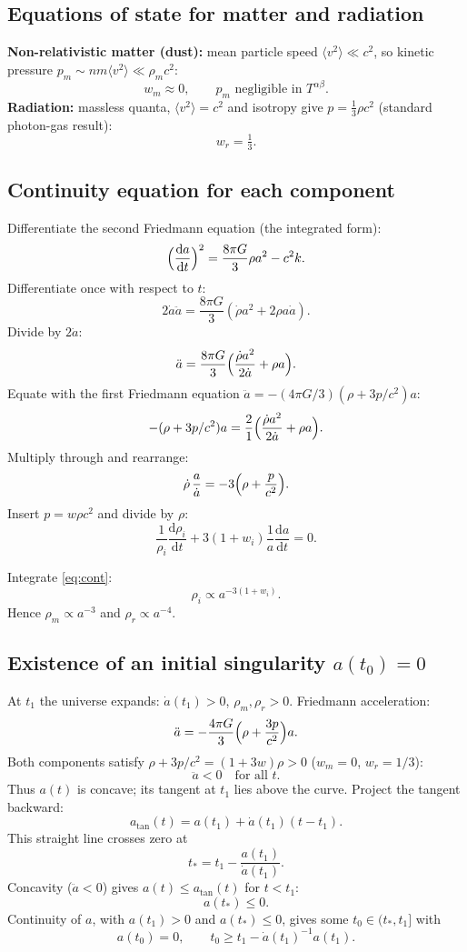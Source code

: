\documentclass[11pt]{article}
\newcommand{\de}{\mathrm{d}}
\begin{document}
\subsection*{Equations of state for matter and radiation}

\textbf{Non-relativistic matter (dust):} mean particle speed $\langle v^{2}\rangle\ll c^{2}$, so kinetic pressure $p_{m}\sim n m\langle v^{2}\rangle\ll \rho_{m} c^{2}$:
\[ w_{m}\approx 0,\qquad p_{m}\text{ negligible in }T^{\alpha\beta}. \]
\textbf{Radiation:} massless quanta, $\langle v^{2}\rangle=c^{2}$ and isotropy give $p=\tfrac13\rho c^{2}$ (standard photon-gas result):
\[ w_{r}=\tfrac13. \]

\subsection*{Continuity equation for each component}

Differentiate the second Friedmann equation (the integrated form):
\[ \Bigl(\frac{\de a}{\de t}\Bigr)^{2} = \frac{8\pi G}{3}\rho a^{2} - c^{2}k. \]
Differentiate once with respect to $t$:
\[ 2\dot a\ddot a = \frac{8\pi G}{3}(\dot\rho a^{2}+2\rho a\dot a). \]
Divide by $2\dot a$:
\[ \ddot a = \frac{8\pi G}{3}\Bigl(\frac{\dot\rho a^{2}}{2\dot a}+\rho a\Bigr). \]
Equate with the first Friedmann equation $\ddot a = -(4\pi G/3)(\rho+3p/c^{2})a$:
\[ -(\rho+3p/c^{2})a = \frac{2}{1}\Bigl(\frac{\dot\rho a^{2}}{2\dot a}+\rho a\Bigr). \]
Multiply through and rearrange:
\[ \dot\rho\,\frac{a}{\dot a} = -3\Bigl(\rho+\frac{p}{c^{2}}\Bigr). \]
Insert $p=w\rho c^{2}$ and divide by $\rho$:
\[ \boxed{\;\frac{1}{\rho_{i}}\frac{\de\rho_{i}}{\de t} + 3(1+w_{i})\frac{1}{a}\frac{\de a}{\de t} = 0.\;}\label{eq:cont} \]

Integrate \eqref{eq:cont}:
\[ \rho_{i} \propto a^{-3(1+w_{i})}. \]
Hence $\rho_{m}\propto a^{-3}$ and $\rho_{r}\propto a^{-4}$.

\subsection*{Existence of an initial singularity $a(t_{0})=0$}

At $t_{1}$ the universe expands: $\dot a(t_{1})>0$, $\rho_{m},\rho_{r}>0$. Friedmann acceleration:
\[ \ddot a = -\frac{4\pi G}{3}\Bigl(\rho+\frac{3p}{c^{2}}\Bigr)a. \]
Both components satisfy $\rho+3p/c^{2}=(1+3w)\rho>0$ ($w_{m}=0$, $w_{r}=1/3$):
\[ \ddot a < 0\quad\text{for all }t. \]
Thus $a(t)$ is concave; its tangent at $t_{1}$ lies above the curve. Project the tangent backward:
\[ a_{\text{tan}}(t) = a(t_{1}) + \dot a(t_{1})(t-t_{1}). \]
This straight line crosses zero at
\[ t_{*} = t_{1} - \frac{a(t_{1})}{\dot a(t_{1})}. \]
Concavity ($\ddot a<0$) gives $a(t)\le a_{\text{tan}}(t)$ for $t<t_{1}$:
\[ a(t_{*})\le 0. \]
Continuity of $a$, with $a(t_{1})>0$ and $a(t_{*})\le 0$, gives some $t_{0}\in(t_{*},t_{1}]$ with
\[ \boxed{\;a(t_{0})=0,\qquad t_{0}\ge t_{1}-\dot a(t_{1})^{-1}a(t_{1}).\;} \]
\end{document}
